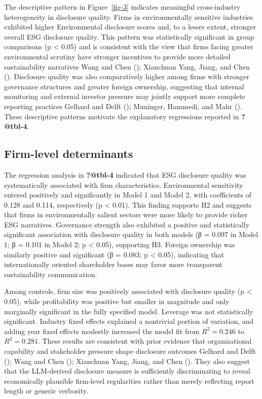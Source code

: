 \documentclass[
  12pt,
]{article}
\begin{document}
The descriptive pattern in Figure~\ref{fig-3} indicates meaningful
cross-industry heterogeneity in disclosure quality. Firms in
environmentally sensitive industries exhibited higher Environmental
disclosure scores and, to a lesser extent, stronger overall ESG
disclosure quality. This pattern was statistically significant in group
comparisons (p \textless{} 0.05) and is consistent with the view that
firms facing greater environmental scrutiny have stronger incentives to
provide more detailed sustainability narratives Wang and Chen
(); Xianchuan Yang, Jiang, and Chen
(). Disclosure quality was also
comparatively higher among firms with stronger governance structures and
greater foreign ownership, suggesting that internal monitoring and
external investor pressure may jointly support more complete reporting
practices Gelhard and Delft ();
Muninger, Hammedi, and Mahr (). These
descriptive patterns motivate the explanatory regressions reported in
\textbf{?@tbl-4}.

\subsection{Firm-level determinants}\label{firm-level-determinants}

The regression analysis in \textbf{?@tbl-4} indicated that ESG
disclosure quality was systematically associated with firm
characteristics. Environmental sensitivity entered positively and
significantly in Model 1 and Model 2, with coefficients of 0.128 and
0.114, respectively (p \textless{} 0.01). This finding supports H2 and
suggests that firms in environmentally salient sectors were more likely
to provide richer ESG narratives. Governance strength also exhibited a
positive and statistically significant association with disclosure
quality in both models (β = 0.097 in Model 1; β = 0.101 in Model 2; p
\textless{} 0.05), supporting H3. Foreign ownership was similarly
positive and significant (β = 0.083; p \textless{} 0.05), indicating
that internationally oriented shareholder bases may favor more
transparent sustainability communication.

Among controls, firm size was positively associated with disclosure
quality (p \textless{} 0.05), while profitability was positive but
smaller in magnitude and only marginally significant in the fully
specified model. Leverage was not statistically significant. Industry
fixed effects explained a nontrivial portion of variation, and adding
year fixed effects modestly increased the model fit from \(R^2 = 0.246\)
to \(R^2 = 0.281\). These results are consistent with prior evidence
that organizational capability and stakeholder pressure shape disclosure
outcomes Gelhard and Delft (); Wang and
Chen (); Xianchuan Yang, Jiang, and Chen
(). They also suggest that the LLM-derived
disclosure measure is sufficiently discriminating to reveal economically
plausible firm-level regularities rather than merely reflecting report
length or generic verbosity.
\end{document}
